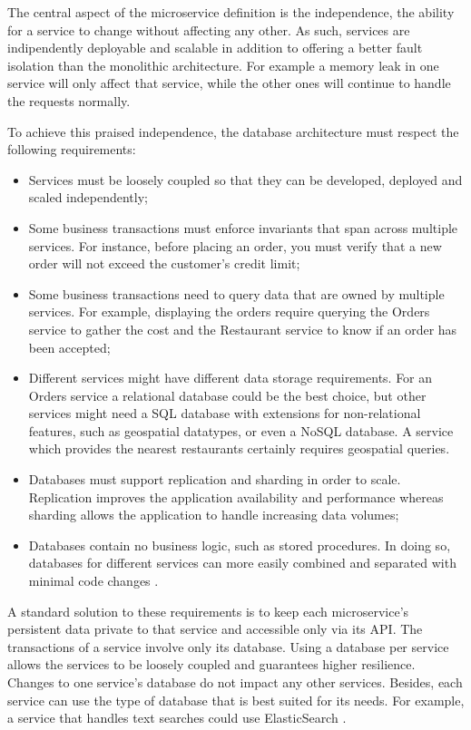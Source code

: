 \documentclass[conference]{IEEEtran}
\begin{document}
The central aspect of the microservice definition is the independence, the ability for a service to change without affecting any other. As such, services are indipendently deployable and scalable in addition to offering a better fault isolation than the monolithic architecture. For example a memory leak in one service will only affect that service, while the other ones will continue to handle the requests normally.

To achieve this praised independence, the database architecture must respect the following requirements:

\begin{itemize}
  \item Services must be loosely coupled so that they can be developed, deployed and scaled independently;
  \item Some business transactions must enforce invariants that span across multiple services. For instance, before placing an order, you must verify that a new order will not exceed the customer’s credit limit;
  \item Some business transactions need to query data that are owned by multiple services. For example, displaying the orders require querying the Orders service to gather the cost and the Restaurant service to know if an order has been accepted;
  \item Different services might have different data storage requirements. For an Orders service a relational database could be the best choice, but other services might need a SQL database with extensions for non-relational features, such as geospatial datatypes, or even a NoSQL database. A service which provides the nearest restaurants certainly requires geospatial queries.
  \item Databases must support replication and sharding in order to scale. Replication improves the application availability and performance whereas sharding allows the application to handle increasing data volumes;
  \item Databases contain no business logic, such as stored procedures. In doing so, databases for different services can more easily combined and separated with minimal code changes \cite{ebay-architecture}.
\end{itemize}

A standard solution to these requirements is to keep each microservice’s persistent data private to that service and accessible only via its API. The transactions of a service involve only its database. 
Using a database per service allows the services to be loosely coupled and guarantees higher resilience. Changes to one service’s database do not impact any other services. Besides, each service can use the type of database that is best suited for its needs. For example, a service that handles text searches could use ElasticSearch \cite{database-per-service}.
\end{document}
